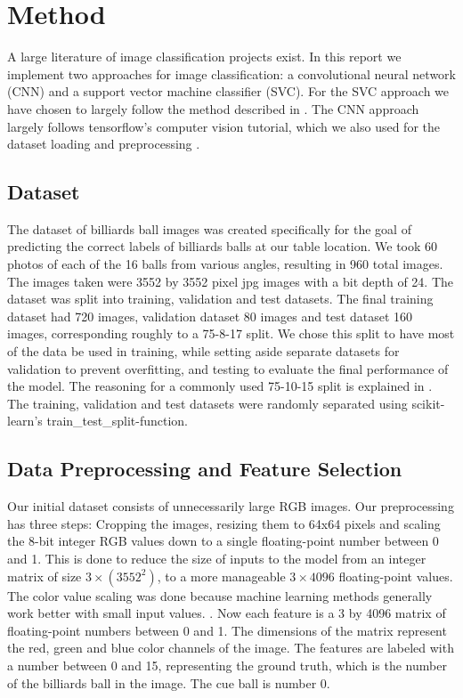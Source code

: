 \documentclass{article}
\begin{document}
\section{Method}
\label{sec:method} %
A large literature of image classification projects exist. In this report we implement two approaches for image classification: a convolutional neural network (CNN) and a support vector machine classifier (SVC). For the SVC approach we have chosen to largely follow the method described in \cite{unknownMachineLearningApproach2023}. The CNN approach largely follows tensorflow's computer vision tutorial, which we also used for the dataset loading and preprocessing \cite{ComputerVisionTensorFlow}.

\subsection{Dataset}
\label{sec:dataset}
The dataset of billiards ball images was created specifically for the goal of predicting the correct labels of billiards balls at our table location. We took 60 photos of each of the 16 balls from various angles, resulting in 960 total images. The images taken were 3552 by 3552 pixel jpg images with a bit depth of 24. The dataset was split into training, validation and test datasets. The final training dataset had 720 images, validation dataset 80 images and test dataset 160 images, corresponding roughly to a 75-8-17 split. We chose this split to have most of the data be used in training, while setting aside separate datasets for validation to prevent overfitting, and testing to evaluate the final performance of the model. The reasoning for a commonly used 75-10-15 split is explained in \cite{josephOptimalRatioData2022}. The training, validation and test datasets were randomly separated using scikit-learn's train\_test\_split-function.

\subsection{Data Preprocessing and Feature Selection} %
\label{sec:data_preprocessing}
Our initial dataset consists of unnecessarily large RGB images. Our preprocessing has three steps: Cropping the images, resizing them to 64x64 pixels and scaling the 8-bit integer RGB values down to a single floating-point number between 0 and 1. This is done to reduce the size of inputs to the model from an integer matrix of size $3\times(3552^2)$, to a more manageable $3\times 4096$ floating-point values. The color value scaling was done because machine learning methods generally work better with small input values. \cite{ImportanceFeatureScaling}. Now each feature is a 3 by 4096 matrix of floating-point numbers between 0 and 1. The dimensions of the matrix represent the red, green and blue color channels of the image. The features are labeled with a number between 0 and 15, representing the ground truth, which is the number of the billiards ball in the image. The cue ball is number 0.
\end{document}

